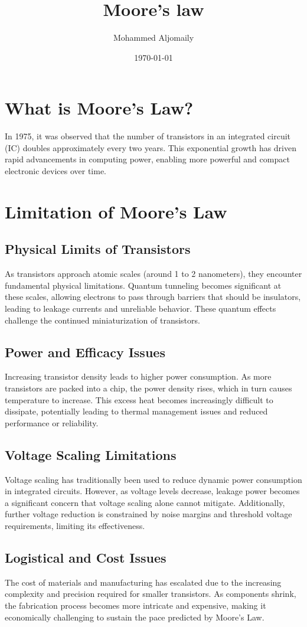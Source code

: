 \documentclass[12pt]{article}
\title{Moore’s law}
\author{Mohammed Aljomaily}
\date{\today}
\begin{document}
\maketitle

\section{What is Moore’s Law?}
In 1975, it was observed that the number of transistors in an integrated circuit (IC) doubles approximately every two years. This exponential growth has driven rapid advancements in computing power, enabling more powerful and compact electronic devices over time.

\section{Limitation of Moore's Law}

\subsection*{Physical Limits of Transistors}
As transistors approach atomic scales (around 1 to 2 nanometers), they encounter fundamental physical limitations. Quantum tunneling becomes significant at these scales, allowing electrons to pass through barriers that should be insulators, leading to leakage currents and unreliable behavior. These quantum effects challenge the continued miniaturization of transistors.

\subsection*{Power and Efficacy Issues}
Increasing transistor density leads to higher power consumption. As more transistors are packed into a chip, the power density rises, which in turn causes temperature to increase. This excess heat becomes increasingly difficult to dissipate, potentially leading to thermal management issues and reduced performance or reliability.

\subsection*{Voltage Scaling Limitations}
Voltage scaling has traditionally been used to reduce dynamic power consumption in integrated circuits. However, as voltage levels decrease, leakage power becomes a significant concern that voltage scaling alone cannot mitigate. Additionally, further voltage reduction is constrained by noise margins and threshold voltage requirements, limiting its effectiveness.

\subsection*{Logistical and Cost Issues}
The cost of materials and manufacturing has escalated due to the increasing complexity and precision required for smaller transistors. As components shrink, the fabrication process becomes more intricate and expensive, making it economically challenging to sustain the pace predicted by Moore’s Law.
\end{document}
